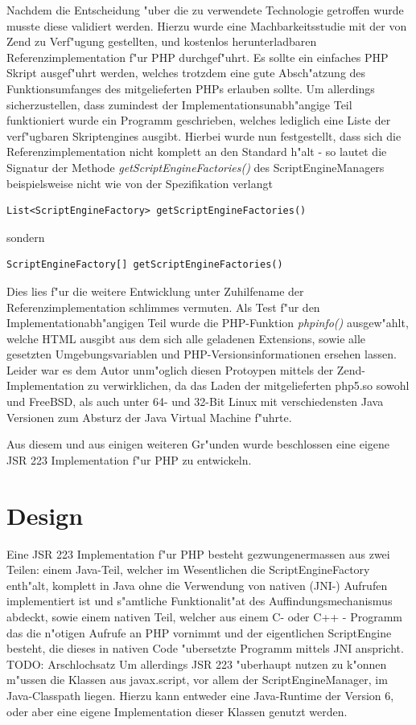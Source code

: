 Nachdem die Entscheidung "uber die zu verwendete Technologie getroffen wurde musste diese validiert werden. Hierzu wurde
eine Machbarkeitsstudie mit der von Zend zu Verf"ugung gestellten, und kostenlos herunterladbaren Referenzimplementation
f"ur PHP durchgef"uhrt. Es sollte ein einfaches PHP Skript ausgef"uhrt werden, welches trotzdem eine gute Absch"atzung
des Funktionsumfanges des mitgelieferten PHPs erlauben sollte. Um allerdings sicherzustellen, dass zumindest der 
Implementationsunabh"angige Teil funktioniert wurde ein Programm geschrieben, welches lediglich eine Liste der verf"ugbaren
Skriptengines ausgibt. Hierbei wurde nun festgestellt, dass sich die Referenzimplementation nicht komplett an den Standard
h"alt - so lautet die Signatur der Methode \emph{getScriptEngineFactories()} des ScriptEngineManagers beispielsweise 
nicht wie von der Spezifikation verlangt
\begin{lstlisting}[name=Vom Standard verlangte Signatur]
    List<ScriptEngineFactory> getScriptEngineFactories()
\end{lstlisting}
sondern
\begin{lstlisting}[name=Signatur in der Referenzimplementation]
    ScriptEngineFactory[] getScriptEngineFactories()
\end{lstlisting}
Dies lies f"ur die weitere Entwicklung unter Zuhilfename der Referenzimplementation schlimmes vermuten.
Als Test f"ur den Implementationabh"angigen Teil wurde die PHP-Funktion \emph{phpinfo()} ausgew"ahlt, welche
HTML ausgibt aus dem sich alle geladenen Extensions, sowie alle gesetzten Umgebungsvariablen und 
PHP-Versionsinformationen ersehen lassen. Leider war es dem Autor unm"oglich diesen Protoypen mittels der Zend-Implementation
zu verwirklichen, da das Laden der mitgelieferten php5.so sowohl und FreeBSD, als auch unter 64- und 32-Bit Linux mit verschiedensten
Java Versionen zum Absturz der Java Virtual Machine f"uhrte.

Aus diesem und aus einigen weiteren Gr"unden wurde beschlossen eine eigene JSR 223 Implementation f"ur PHP zu entwickeln.

\section{Design}
\label{sec:chap1:design}

Eine JSR 223 Implementation f"ur PHP besteht gezwungenermassen aus zwei Teilen: einem Java-Teil, welcher im Wesentlichen
die ScriptEngineFactory enth"alt, komplett in Java ohne die Verwendung von nativen (JNI-) Aufrufen implementiert ist und
s"amtliche Funktionalit"at des Auffindungsmechanismus abdeckt, sowie einem nativen Teil, welcher aus 
einem C- oder C++ - Programm das die n"otigen Aufrufe an PHP vornimmt und der eigentlichen ScriptEngine besteht, die dieses in
nativen Code "ubersetzte Programm mittels JNI anspricht. TODO: Arschlochsatz
Um allerdings JSR 223 "uberhaupt nutzen zu k"onnen m"ussen die Klassen aus javax.script, vor allem der ScriptEngineManager, 
im Java-Classpath liegen. Hierzu kann entweder eine Java-Runtime der Version 6, oder aber eine eigene Implementation dieser
Klassen genutzt werden.


